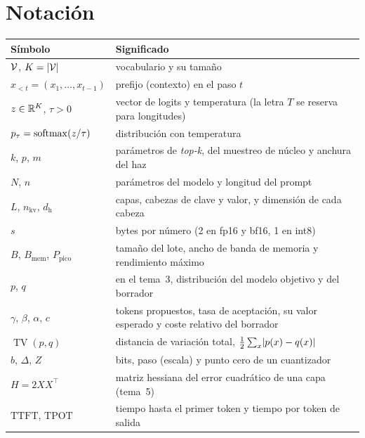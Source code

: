 \documentclass[11pt,a4paper,twoside,openany]{book}
\newcommand{\T}{^{\top}}
\newcommand{\TV}{\operatorname{TV}}
\newcommand{\Bmem}{B_{\mathrm{mem}}}
\newcommand{\Ppico}{P_{\mathrm{pico}}}
\newcommand{\nkv}{n_{\mathrm{kv}}}
\newcommand{\dhd}{d_{\mathrm{h}}}
\newcommand{\TTFT}{\mathrm{TTFT}}
\newcommand{\TPOT}{\mathrm{TPOT}}
\begin{document}
\section*{Notación}
\begin{center}\small
\begin{tabularx}{\textwidth}{@{}l>{\raggedright\arraybackslash}X@{}}
\toprule
Símbolo & Significado \\
\midrule
$\mathcal{V}$, $K=\lvert\mathcal{V}\rvert$ & vocabulario y su tamaño \\
$x_{<t}=(x_1,\dots,x_{t-1})$ & prefijo (contexto) en el paso $t$ \\
$z\in\mathbb{R}^{K}$, $\tau>0$ & vector de logits y temperatura (la letra $T$ se reserva para longitudes) \\
$p_\tau=\operatorname{softmax}(z/\tau)$ & distribución con temperatura \\
$k$, $p$, $m$ & parámetros de \emph{top-k}, del muestreo de núcleo y anchura del haz \\
$N$, $n$ & parámetros del modelo y longitud del prompt \\
$L$, $\nkv$, $\dhd$ & capas, cabezas de clave y valor, y dimensión de cada cabeza \\
$s$ & bytes por número (2 en fp16 y bf16, 1 en int8) \\
$B$, $\Bmem$, $\Ppico$ & tamaño del lote, ancho de banda de memoria y rendimiento máximo \\
$p$, $q$ & en el tema~3, distribución del modelo objetivo y del borrador \\
$\gamma$, $\beta$, $\alpha$, $c$ & tokens propuestos, tasa de aceptación, su valor esperado y coste relativo del borrador \\
$\TV(p,q)$ & distancia de variación total, $\frac12\sum_x\lvert p(x)-q(x)\rvert$ \\
$b$, $\Delta$, $Z$ & bits, paso (escala) y punto cero de un cuantizador \\
$H=2XX\T$ & matriz hessiana del error cuadrático de una capa (tema~5) \\
$\TTFT$, $\TPOT$ & tiempo hasta el primer token y tiempo por token de salida \\
\bottomrule
\end{tabularx}
\end{center}


\tableofcontents

\mainmatter







\backmatter

\end{document}
